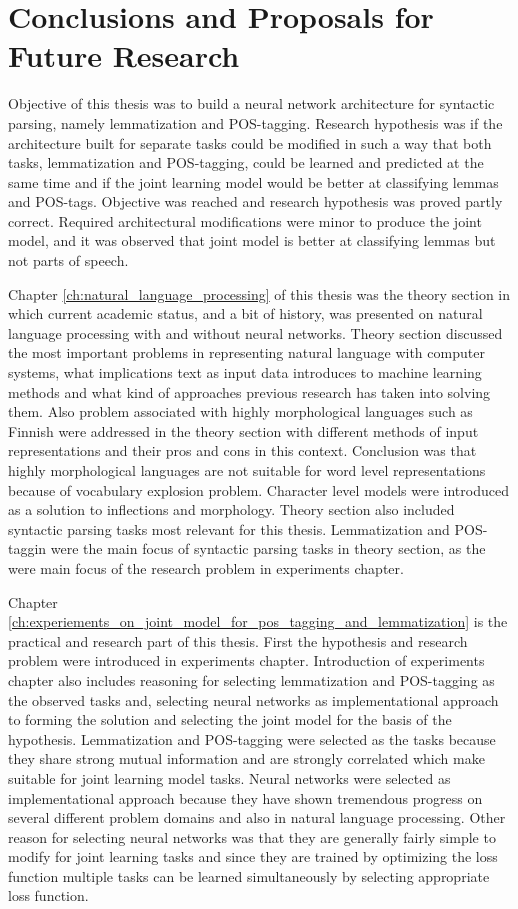 \documentclass[12pt,a4paper,english
]{tutthesis}
\begin{document}
\chapter{Conclusions and Proposals for Future Research}
\label{ch:conclusions}
Objective of this thesis was to build a neural network architecture for syntactic parsing, namely lemmatization and POS-tagging. Research hypothesis was if the architecture built for separate tasks could be modified in such a way that both tasks, lemmatization and POS-tagging, could be learned and predicted at the same time and if the joint learning model would be better at classifying lemmas and POS-tags. Objective was reached and research hypothesis was proved partly correct. Required architectural modifications were minor to produce the joint model, and it was observed that joint model is better at classifying lemmas but not parts of speech.

Chapter \ref{ch:natural_language_processing} of this thesis was the theory section in which current academic status, and a bit of history, was presented on natural language processing with and without neural networks. Theory section discussed the most important problems in representing natural language with computer systems, what implications text as input data introduces to machine learning methods and what kind of approaches previous research has taken into solving them. Also problem associated with highly morphological languages such as Finnish were addressed in the theory section with different methods of input representations and their pros and cons in this context. Conclusion was that highly morphological languages are not suitable for word level representations because of vocabulary explosion problem. Character level models were introduced as a solution to inflections and morphology. Theory section also included syntactic parsing tasks most relevant for this thesis. Lemmatization and POS-taggin were the main focus of syntactic parsing tasks in theory section, as the were main focus of the research problem in experiments chapter.

Chapter \ref{ch:experiements_on_joint_model_for_pos_tagging_and_lemmatization} is the practical and research part of this thesis. First the hypothesis and research problem were introduced in experiments chapter. Introduction of experiments chapter also includes reasoning for selecting lemmatization and POS-tagging as the observed tasks and, selecting neural networks as implementational approach to forming the solution and selecting the joint model for the basis of the hypothesis. Lemmatization and POS-tagging were selected as the tasks because they share strong mutual information and are strongly correlated which make suitable for joint learning model tasks. Neural networks were selected as implementational approach because they have shown tremendous progress on several different problem domains and also in natural language processing. Other reason for selecting neural networks was that they are generally fairly simple to modify for joint learning tasks and since they are trained by optimizing the loss function multiple tasks can be learned simultaneously by selecting appropriate loss function.
\end{document}
